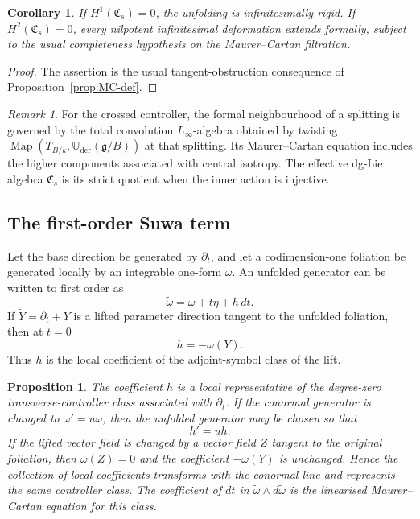 \documentclass[11pt,reqno,a4paper,dvipsnames,x11names]{amsart}
\numberwithin{equation}{section}
\theoremstyle{plain}
\newtheorem{proposition}[theorem]{Proposition}
\newtheorem{corollary}[theorem]{Corollary}
\theoremstyle{definition}
\theoremstyle{remark}
\newtheorem{remark}[theorem]{Remark}
\DeclareMathOperator{\Map}{Map}
\newcommand{\kk}{k}
\newcommand{\g}{\mathfrak g}
\newcommand{\Uder}{\mathbb U_{\mathrm{der}}}
\begin{document}
\begin{corollary}\label{cor:rigidity}
If \(H^1(\mathfrak C_s)=0\), the unfolding is infinitesimally rigid. If \(H^2(\mathfrak C_s)=0\), every nilpotent infinitesimal deformation extends formally, subject to the usual completeness hypothesis on the Maurer--Cartan filtration.
\end{corollary}

\begin{proof}
The assertion is the usual tangent-obstruction consequence of Proposition~\ref{prop:MC-def}.
\end{proof}

\begin{remark}
For the crossed controller, the formal neighbourhood of a splitting is governed by the total convolution \(L_\infty\)-algebra obtained by twisting
\(\Map(T_{B/\kk},\Uder(\g/B))\) at that splitting. Its Maurer--Cartan equation includes the higher components associated with central isotropy. The effective dg-Lie algebra \(\mathfrak C_s\) is its strict quotient when the inner action is injective.
\end{remark}

\subsection{The first-order Suwa term}

Let the base direction be generated by \(\partial_t\), and let a codimension-one foliation be generated locally by an integrable one-form \(\omega\). An unfolded generator can be written to first order as
\[
 \widetilde\omega=\omega+t\eta+h\,dt.
\]
If \(\widetilde Y=\partial_t+Y\) is a lifted parameter direction tangent to the unfolded foliation, then at \(t=0\)
\[
 h=-\omega(Y).
\]
Thus \(h\) is the local coefficient of the adjoint-symbol class of the lift.

\begin{proposition}\label{prop:suwa-class}
The coefficient \(h\) is a local representative of the degree-zero transverse-controller class associated with \(\partial_t\). If the conormal generator is changed to
\(\omega'=u\omega\), then the unfolded generator may be chosen so that
\[
 h'=u h.
\]
If the lifted vector field is changed by a vector field \(Z\) tangent to the original foliation, then
\(\omega(Z)=0\) and the coefficient \(-\omega(Y)\) is unchanged. Hence the collection of local coefficients transforms with the conormal line and represents the same controller class. The coefficient of \(dt\) in
\(\widetilde\omega\wedge d\widetilde\omega\) is the linearised Maurer--Cartan equation for this class.
\end{proposition}
\end{document}
